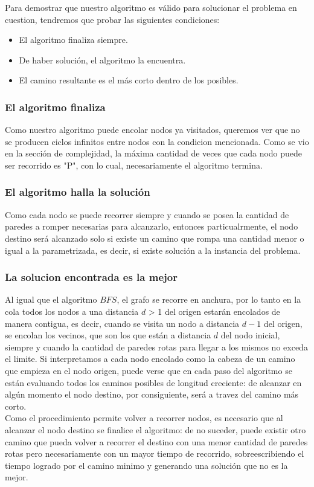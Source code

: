 Para demostrar que nuestro algoritmo es válido para solucionar el problema en cuestion, tendremos que probar las siguientes condiciones:\\

\begin{itemize}
\item El algoritmo finaliza siempre.
\item De haber solución, el algoritmo la encuentra.
\item El camino resultante es el m\'as corto dentro de los posibles.
\end{itemize}

\subsubsection*{El algoritmo finaliza }
Como nuestro algoritmo puede encolar nodos ya visitados, queremos ver que no se producen ciclos infinitos entre nodos con la condicion mencionada. Como se vio en la sección de complejidad, la máxima cantidad de veces que cada nodo puede ser recorrido es "P", con lo cual, necesariamente el algoritmo termina.

\subsubsection*{El algoritmo halla la solución}

Como cada nodo se puede recorrer siempre y cuando se posea la cantidad de paredes a romper necesarias para alcanzarlo, entonces particualrmente, el nodo destino será alcanzado solo si existe un camino que rompa una cantidad menor o igual a la parametrizada, es decir, si existe solución a la instancia del problema. 

\subsubsection*{La solucion encontrada es la mejor}

Al igual que el algoritmo $BFS$, el grafo se recorre en anchura, por lo tanto en la cola todos los nodos a una distancia $d$ > 1 del origen estarán encolados de manera contigua, es decir, cuando se visita un nodo a distancia $d-1$ del origen, se encolan los vecinos, que son los que están a distancia $d$ del nodo inicial, siempre y cuando la cantidad de paredes rotas para llegar a los mismos no exceda el limite. Si interpretamos a cada nodo encolado como la cabeza de un camino que empieza en el nodo origen, puede verse que en cada paso del algoritmo se están evaluando todos los caminos posibles de longitud creciente: de alcanzar en algún momento el nodo destino, por consiguiente, será a travez del camino más corto.\\

Como el procedimiento permite volver a recorrer nodos, es necesario que al alcanzar el nodo destino se finalice el algoritmo: de no suceder, puede existir otro camino que pueda volver a recorrer el destino con una menor cantidad de paredes rotas pero necesariamente con un mayor tiempo de recorrido, sobreescribiendo el tiempo logrado por el camino minimo y generando una solución que no es la mejor.



